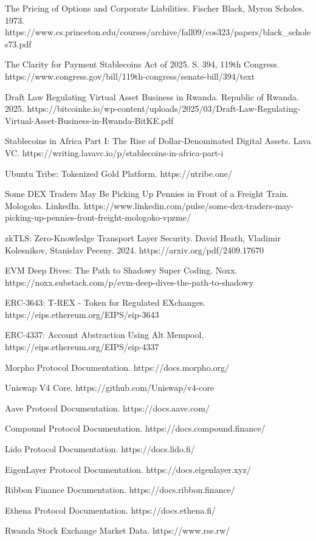 \documentclass[12pt]{article}
\begin{document}
The Pricing of Options and Corporate Liabilities. Fischer Black, Myron Scholes. 1973. https://www.cs.princeton.edu/courses/archive/fall09/cos323/papers/black_scholes73.pdf

The Clarity for Payment Stablecoins Act of 2025. S. 394, 119th Congress. https://www.congress.gov/bill/119th-congress/senate-bill/394/text

Draft Law Regulating Virtual Asset Business in Rwanda. Republic of Rwanda. 2025. https://bitcoinke.io/wp-content/uploads/2025/03/Draft-Law-Regulating-Virtual-Asset-Business-in-Rwanda-BitKE.pdf

Stablecoins in Africa Part I: The Rise of Dollar-Denominated Digital Assets. Lava VC. https://writing.lavavc.io/p/stablecoins-in-africa-part-i

Ubuntu Tribe: Tokenized Gold Platform. https://utribe.one/

Some DEX Traders May Be Picking Up Pennies in Front of a Freight Train. Mologoko. LinkedIn. https://www.linkedin.com/pulse/some-dex-traders-may-picking-up-pennies-front-freight-mologoko-vpzme/

zkTLS: Zero-Knowledge Transport Layer Security. David Heath, Vladimir Kolesnikov, Stanislav Peceny. 2024. https://arxiv.org/pdf/2409.17670

EVM Deep Dives: The Path to Shadowy Super Coding. Noxx. https://noxx.substack.com/p/evm-deep-dives-the-path-to-shadowy

ERC-3643: T-REX - Token for Regulated EXchanges. https://eips.ethereum.org/EIPS/eip-3643

ERC-4337: Account Abstraction Using Alt Mempool. https://eips.ethereum.org/EIPS/eip-4337

Morpho Protocol Documentation. https://docs.morpho.org/

Uniswap V4 Core. https://github.com/Uniswap/v4-core

Aave Protocol Documentation. https://docs.aave.com/

Compound Protocol Documentation. https://docs.compound.finance/

Lido Protocol Documentation. https://docs.lido.fi/

EigenLayer Protocol Documentation. https://docs.eigenlayer.xyz/

Ribbon Finance Documentation. https://docs.ribbon.finance/

Ethena Protocol Documentation. https://docs.ethena.fi/

Rwanda Stock Exchange Market Data. https://www.rse.rw/
\end{document}
